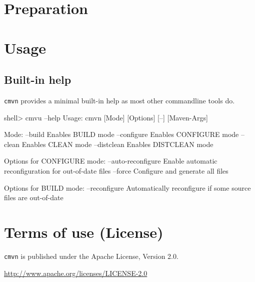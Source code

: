 \documentclass[a4paper,11pt,english,oneside,halfparskip]{scrartcl}
\newcommand{\CMVN}{\texttt{cmvn}}
\newcommand{\code}[1]{\texttt{#1}}
\begin{document}



\section{Preparation}


\section{Usage}

\subsection{Built-in help}

\CMVN{} provides a minimal built-in help as most other commandline tools do.

\begin{Cmdline}[caption={Output of \code{cmvn --help}}]
shell> cmvu --help
Usage: cmvn [Mode] [Options] [--] [Maven-Args]

Mode:
   --build       Enables BUILD mode
   --configure   Enables CONFIGURE mode
   --clean       Enables CLEAN mode
   --distclean   Enables DISTCLEAN mode

Options for CONFIGURE mode:
   --auto-reconfigure  Enable automatic reconfiguration for out-of-date 
                       files
   --force             Configure and generate all files

Options for BUILD mode:
   --reconfigure   Automatically reconfigure if some source files are 
                   out-of-date

\end{Cmdline}


\section{Terms of use (License)}

\CMVN{} is published under the Apache License, Version 2.0.

\url{http://www.apache.org/licenses/LICENSE-2.0}
\end{document}
